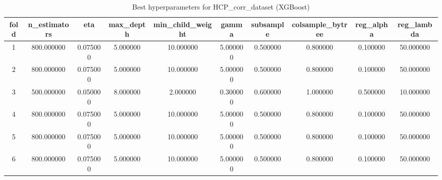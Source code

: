 \begin{table}[htbp]
\caption{Best hyperparameters for HCP_corr_dataset (XGBoost)}
\label{tab:best_hyperparams_HCP_corr_dataset}
\begin{tabular}{cccccccccc}
\toprule
fold & n_estimators & eta & max_depth & min_child_weight & gamma & subsample & colsample_bytree & reg_alpha & reg_lambda \\
\midrule
1 & 800.000000 & 0.075000 & 5.000000 & 10.000000 & 5.000000 & 0.500000 & 0.800000 & 0.100000 & 50.000000 \\
2 & 800.000000 & 0.075000 & 5.000000 & 10.000000 & 5.000000 & 0.500000 & 0.800000 & 0.100000 & 50.000000 \\
3 & 500.000000 & 0.050000 & 8.000000 & 2.000000 & 0.300000 & 0.600000 & 1.000000 & 0.500000 & 10.000000 \\
4 & 800.000000 & 0.075000 & 5.000000 & 10.000000 & 5.000000 & 0.500000 & 0.800000 & 0.100000 & 50.000000 \\
5 & 800.000000 & 0.075000 & 5.000000 & 10.000000 & 5.000000 & 0.500000 & 0.800000 & 0.100000 & 50.000000 \\
6 & 800.000000 & 0.075000 & 5.000000 & 10.000000 & 5.000000 & 0.500000 & 0.800000 & 0.100000 & 50.000000 \\
\bottomrule
\end{tabular}
\end{table}
